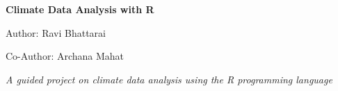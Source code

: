 \documentclass[12pt,a4paper,openany]{book}
\begin{document}
\begin{titlepage}
    \centering
    \vspace*{5cm}
    
    {\Huge\bfseries Climate Data Analysis with R \par}
    \vspace{2cm}
    
    {\Large Author: Ravi Bhattarai \par}
    \vspace{0.5cm}
    {\Large Co-Author: Archana Mahat \par}
    \vspace{1cm}
    {\small\textit{A guided project on climate data analysis using the R programming language} \par}
    
    \vspace{2cm}
\end{titlepage}


\tableofcontents















\end{document}
